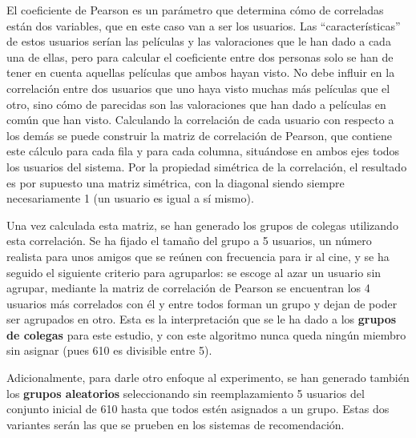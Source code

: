 El coeficiente de Pearson es un parámetro que determina cómo de correladas están dos variables, que en este caso van a ser los usuarios. Las ``características'' de estos usuarios serían las películas y las valoraciones que le han dado a cada una de ellas, pero para calcular el coeficiente entre dos personas solo se han de tener en cuenta aquellas películas que ambos hayan visto. No debe influir en la correlación entre dos usuarios que uno haya visto muchas más películas que el otro, sino cómo de parecidas son las valoraciones que han dado a películas en común que han visto. Calculando la correlación de cada usuario con respecto a los demás se puede construir la matriz de correlación de Pearson, que contiene este cálculo para cada fila y para cada columna, situándose en ambos ejes todos los usuarios del sistema. Por la propiedad simétrica de la correlación, el resultado es por supuesto una matriz simétrica, con la diagonal siendo siempre necesariamente 1 (un usuario es igual a sí mismo).

Una vez calculada esta matriz, se han generado los grupos de colegas utilizando esta correlación. Se ha fijado el tamaño del grupo a 5 usuarios, un número realista para unos amigos que se reúnen con frecuencia para ir al cine, y se ha seguido el siguiente criterio para agruparlos: se escoge al azar un usuario sin agrupar, mediante la matriz de correlación de Pearson se encuentran los 4 usuarios más correlados con él y entre todos forman un grupo y dejan de poder ser agrupados en otro. Esta es la interpretación que se le ha dado a los \textbf{grupos de colegas} para este estudio, y con este algoritmo nunca queda ningún miembro sin asignar (pues 610 es divisible entre 5).

Adicionalmente, para darle otro enfoque al experimento, se han generado también los \textbf{grupos aleatorios} seleccionando sin reemplazamiento 5 usuarios del conjunto inicial de 610 hasta que todos estén asignados a un grupo. Estas dos variantes serán las que se prueben en los sistemas de recomendación.